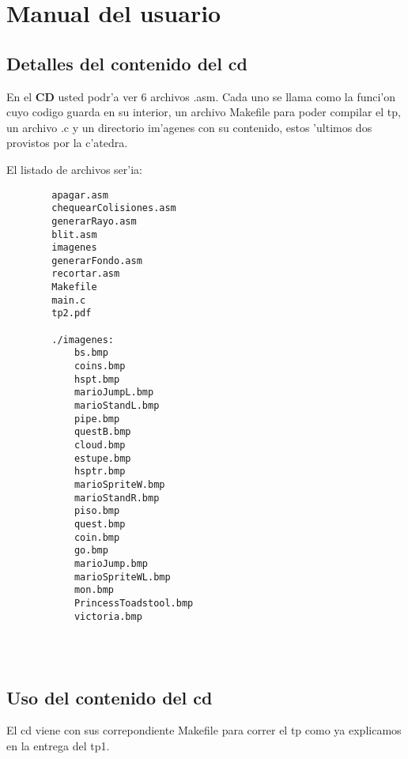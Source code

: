\section{Manual del usuario}

\subsection{Detalles del contenido del cd}

	En el \textbf{CD} usted podr'a ver 6 archivos .asm. Cada uno se llama como
la funci'on cuyo codigo guarda en su interior, un archivo Makefile para poder
compilar el tp, un archivo .c y un directorio im'agenes con su contenido, estos
'ultimos dos provistos por la c'atedra.

	El listado de archivos ser'ia:
\begin{verbatim}
		apagar.asm     
		chequearColisiones.asm  
		generarRayo.asm 
		blit.asm 
		imagenes 
		generarFondo.asm
		recortar.asm
		Makefile
		main.c
		tp2.pdf

		./imagenes:
			bs.bmp
			coins.bmp
			hspt.bmp
			marioJumpL.bmp
			marioStandL.bmp
			pipe.bmp
			questB.bmp
			cloud.bmp
			estupe.bmp
			hsptr.bmp
			marioSpriteW.bmp
			marioStandR.bmp
			piso.bmp
			quest.bmp
			coin.bmp
			go.bmp
			marioJump.bmp
			marioSpriteWL.bmp
			mon.bmp
			PrincessToadstool.bmp
			victoria.bmp




\end{verbatim}

\subsection{Uso del contenido del cd}

El cd viene con sus correpondiente Makefile para correr el tp como ya
explicamos en la entrega del tp1.
